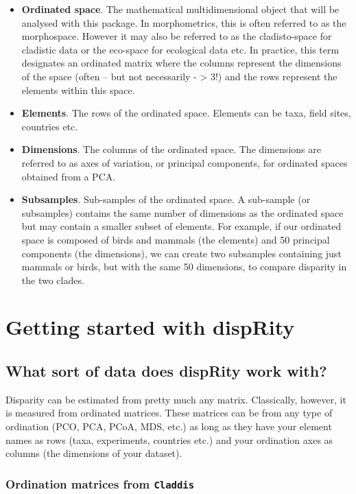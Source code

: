 \documentclass[]{book}
\theoremstyle{definition}
\theoremstyle{definition}
\theoremstyle{remark}
\begin{document}
\begin{itemize}
\item
  \textbf{Ordinated space}. The mathematical multidimensional object
  that will be analysed with this package. In morphometrics, this is
  often referred to as the morphospace. However it may also be referred
  to as the cladisto-space for cladistic data or the eco-space for
  ecological data etc. In practice, this term designates an ordinated
  matrix where the columns represent the dimensions of the space (often
  -- but not necessarily - \textgreater{} 3!) and the rows represent the
  elements within this space.
\item
  \textbf{Elements}. The rows of the ordinated space. Elements can be
  taxa, field sites, countries etc.
\item
  \textbf{Dimensions}. The columns of the ordinated space. The
  dimensions are referred to as axes of variation, or principal
  components, for ordinated spaces obtained from a PCA.
\item
  \textbf{Subsamples}. Sub-samples of the ordinated space. A sub-sample
  (or subsamples) contains the same number of dimensions as the
  ordinated space but may contain a smaller subset of elements. For
  example, if our ordinated space is composed of birds and mammals (the
  elements) and 50 principal components (the dimensions), we can create
  two subsamples containing just mammals or birds, but with the same 50
  dimensions, to compare disparity in the two clades.
\end{itemize}

\chapter{Getting started with
dispRity}\label{getting-started-with-disprity}

\section{What sort of data does dispRity work
with?}\label{what-sort-of-data-does-disprity-work-with}

Disparity can be estimated from pretty much any matrix. Classically,
however, it is measured from ordinated matrices. These matrices can be
from any type of ordination (PCO, PCA, PCoA, MDS, etc.) as long as they
have your element names as rows (taxa, experiments, countries etc.) and
your ordination axes as columns (the dimensions of your dataset).

\subsection{\texorpdfstring{Ordination matrices from
\texttt{Claddis}}{Ordination matrices from Claddis}}\label{ordination-matrices-from-claddis}
\end{document}
